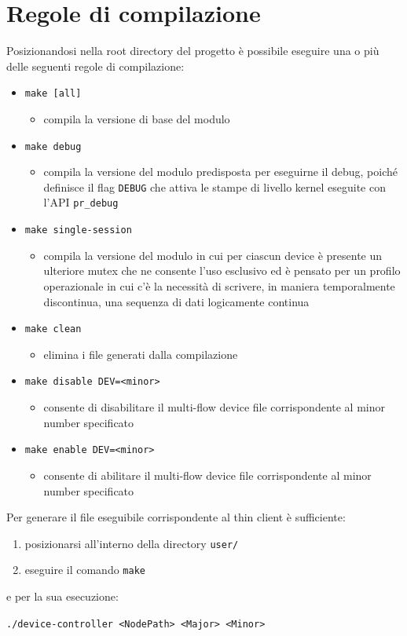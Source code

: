 \documentclass{article}
\begin{document}
\section{Regole di compilazione}
Posizionandosi nella root directory del progetto è possibile eseguire una o più delle seguenti regole di compilazione:
\begin{itemize}
\item \texttt{make [all]}
\begin{itemize}
\item compila la versione di base del modulo
\end{itemize}
\item \texttt{make debug}
\begin{itemize}
\item compila la versione del modulo predisposta per eseguirne il debug, poiché definisce il flag \texttt{DEBUG} che attiva le stampe di livello kernel eseguite con l'API \texttt{pr\_debug}
\end{itemize}
\item \texttt{make single-session}
\begin{itemize}
\item compila la versione del modulo in cui per ciascun device è presente un ulteriore mutex che ne consente l'uso esclusivo ed è pensato per un profilo operazionale in cui c'è la necessità di scrivere, in maniera temporalmente discontinua, una sequenza di dati logicamente continua
\end{itemize}
\item \texttt{make clean}
\begin{itemize}
\item elimina i file generati dalla compilazione
\end{itemize}
\item \texttt{make disable DEV=<minor>}
\begin{itemize}
\item consente di disabilitare il multi-flow device file corrispondente al minor number specificato
\end{itemize}
\item \texttt{make enable DEV=<minor>}
\begin{itemize}
\item consente di abilitare il multi-flow device file corrispondente al minor number specificato
\end{itemize}
\end{itemize}

Per generare il file eseguibile corrispondente al thin client è sufficiente:
\begin{enumerate}
\item posizionarsi all'interno della directory \texttt{user/}
\item eseguire il comando \texttt{make}
\end{enumerate}
e per la sua esecuzione:
\begin{center}
\texttt{./device-controller <NodePath> <Major> <Minor>}
\end{center}
\end{document}
